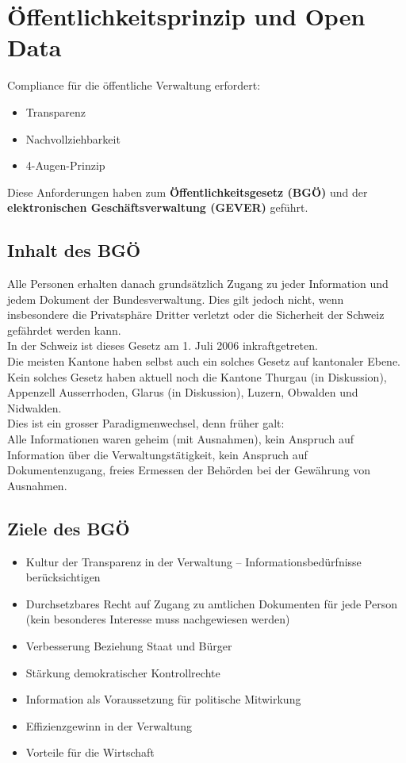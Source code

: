 \section{Öffentlichkeitsprinzip und Open Data}

Compliance für die öffentliche Verwaltung erfordert:

\begin{itemize}
	\tightlist
	\item Transparenz
	\item Nachvollziehbarkeit
	\item 4-Augen-Prinzip
\end{itemize}

Diese Anforderungen haben zum \textbf{Öffentlichkeitsgesetz (BGÖ)} und der
\textbf{elektronischen Geschäftsverwaltung (GEVER)} geführt.

\subsection{Inhalt des BGÖ}
Alle Personen erhalten danach grundsätzlich Zugang zu jeder Information und
jedem Dokument der Bundesverwaltung. Dies gilt jedoch nicht, wenn
insbesondere die Privatsphäre Dritter verletzt oder die Sicherheit der Schweiz
gefährdet werden kann.\\
In der Schweiz ist dieses Gesetz am 1. Juli 2006 inkraftgetreten.\\

Die meisten Kantone haben selbst auch ein solches Gesetz auf kantonaler Ebene.
Kein solches Gesetz haben aktuell noch die Kantone Thurgau (in Diskussion),
Appenzell Ausserrhoden, Glarus (in Diskussion), Luzern, Obwalden und Nidwalden.\\

Dies ist ein grosser Paradigmenwechsel, denn früher galt:\\
Alle Informationen waren geheim (mit Ausnahmen), kein Anspruch auf Information
über die Verwaltungstätigkeit, kein Anspruch auf Dokumentenzugang,
freies Ermessen der Behörden bei der Gewährung von Ausnahmen.

\subsection{Ziele des BGÖ}

\begin{itemize}
	\tightlist
	\item Kultur der Transparenz in der Verwaltung – Informationsbedürfnisse
	berücksichtigen
	\item Durchsetzbares Recht auf Zugang zu amtlichen Dokumenten für jede
	Person (kein besonderes Interesse muss nachgewiesen werden)
	\item Verbesserung Beziehung Staat und Bürger
	\item Stärkung demokratischer Kontrollrechte
	\item Information als Voraussetzung für politische Mitwirkung
	\item Effizienzgewinn in der Verwaltung
	\item Vorteile für die Wirtschaft
\end{itemize}

